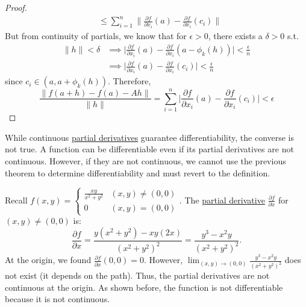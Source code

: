 \begin{proof}
\begin{align}
																						 & \leq \sum_{i=1}^n \bigg\| \frac{\partial f}{\partial x_i} (a) - \frac{\partial f}{\partial x_i} (c_i) \bigg\| 
		\end{align}
		But from continuity of partials, we know that for $\epsilon > 0$, there exists a $\delta > 0$ s.t. 
		\begin{align}
			\|h\| < \delta & \implies \bigg| \frac{\partial f}{\partial x_i} (a) - \frac{\partial f}{\partial x_i} (a - \phi_k(h)) \bigg| < \frac{\epsilon}{n} \\ 
										 & \implies \bigg| \frac{\partial f}{\partial x_i} (a) - \frac{\partial f}{\partial x_i} (c_i) \bigg| < \frac{\epsilon}{n} 
		\end{align}
		since $c_i \in (a, a + \phi_k (h))$. Therefore, 
		\begin{equation}
			\frac{\|f(a + h) - f(a) - Ah\|}{\|h\|} = \sum_{i=1}^n \bigg| \frac{\partial f}{\partial x_i} (a) - \frac{\partial f}{\partial x_i} (c_i) \bigg| < \epsilon
		\end{equation}
	\end{proof}

	While continuous \hyperref[def:partial-derivative]{partial derivatives} guarantee differentiability, the converse is not true. A function can be differentiable even if its partial derivatives are not continuous. However, if they are not continuous, we cannot use the previous theorem to determine differentiability and must revert to the definition.

	\begin{example}
	  \label{ex:non-continuous-partials-and-not-differentiable}
		Recall $f(x, y) = \begin{cases} \frac{xy}{x^2 + y^2} & (x, y) \neq (0, 0) \\ 0 & (x, y) = (0, 0) \end{cases}$.
		The \hyperref[def:partial-derivative]{partial derivative} $\frac{\partial f}{\partial x}$ for $(x, y) \neq (0, 0)$ is:
		\begin{equation}
		  \frac{\partial f}{\partial x} = \frac{y(x^2 + y^2) - xy(2x)}{(x^2 + y^2)^2} = \frac{y^3 - x^2 y}{(x^2 + y^2)^2}.
		\end{equation}
		At the origin, we found $\frac{\partial f}{\partial x}(0, 0) = 0$. However, $\lim_{(x, y) \to (0, 0)} \frac{y^3 - x^2 y}{(x^2 + y^2)^2}$ does not exist (it depends on the path). Thus, the partial derivatives are not continuous at the origin. As shown before, the function is not differentiable because it is not continuous.
	\end{example}

